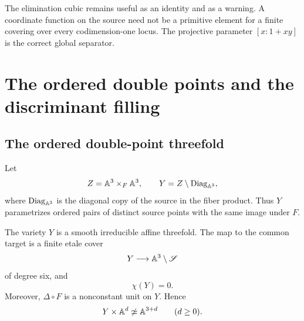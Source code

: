 \begin{remark}\label{rem:elimination-warning}
The elimination cubic remains useful as an identity and as a warning.  A coordinate function on the source need not be a primitive element for a finite covering over every codimension-one locus.  The projective parameter $[x:1+xy]$ is the correct global separator.
\end{remark}

\section{The ordered double points and the discriminant filling}\label{sec:double-filling}

\subsection{The ordered double-point threefold}

\begin{definition}\label{def:ordered-double-points}
Let
\[
  Z=\mathbb A^3\times_F\mathbb A^3,
  \qquad
  Y=Z\setminus\operatorname{Diag}_{\mathbb A^3},
\]
where $\operatorname{Diag}_{\mathbb A^3}$ is the diagonal copy of the source in the fiber product.  Thus $Y$ parametrizes ordered pairs of distinct source points with the same image under $F$.
\end{definition}

\begin{theorem}\label{thm:Y}
The variety $Y$ is a smooth irreducible affine threefold.  The map to the common target is a finite etale cover
\[
  Y\longrightarrow\mathbb A^3\setminus\mathscr S
\]
of degree six, and
\[
  \chi(Y)=0.
\]
Moreover, $\Delta\circ F$ is a nonconstant unit on $Y$.  Hence
\[
  Y\times\mathbb A^d\not\simeq\mathbb A^{3+d}
  \qquad(d\geq0).
\]
\end{theorem}

